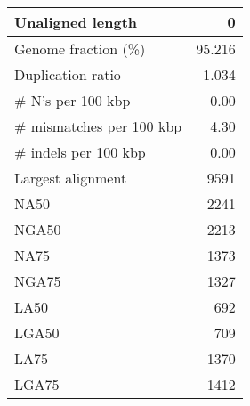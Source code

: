 \documentclass[12pt,a4paper]{article}
\begin{document}
\begin{table}[ht]
\begin{center}
\begin{tabular}{|l*{1}{|r}|}
Unaligned length & 0 \\ \hline
Genome fraction (\%) & 95.216 \\ \hline
Duplication ratio & 1.034 \\ \hline
\# N's per 100 kbp & 0.00 \\ \hline
\# mismatches per 100 kbp & 4.30 \\ \hline
\# indels per 100 kbp & 0.00 \\ \hline
Largest alignment & 9591 \\ \hline
NA50 & 2241 \\ \hline
NGA50 & 2213 \\ \hline
NA75 & 1373 \\ \hline
NGA75 & 1327 \\ \hline
LA50 & 692 \\ \hline
LGA50 & 709 \\ \hline
LA75 & 1370 \\ \hline
LGA75 & 1412 \\ \hline
\end{tabular}
\end{center}
\end{table}
\end{document}
